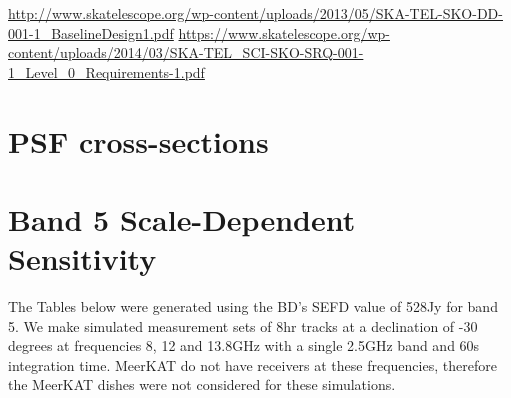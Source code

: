 \documentclass[sfheadings,a4paper,times,9pt,floats,floatfix]{article}
\begin{document}
\begin{thebibliography}{99}
  \url{http://www.skatelescope.org/wp-content/uploads/2013/05/SKA-TEL-SKO-DD-001-1_BaselineDesign1.pdf}
  \url{https://www.skatelescope.org/wp-content/uploads/2014/03/SKA-TEL_SCI-SKO-SRQ-001-1_Level_0_Requirements-1.pdf}
\end{thebibliography}
\pagebreak
\appendix
\section{PSF cross-sections}\label{app:psf}
\section{Band 5 Scale-Dependent Sensitivity}\label{sec:band5}
The Tables below were generated using the BD's SEFD value of 528Jy for band 5. We make simulated measurement sets of 8hr tracks
at a declination of -30 degrees at frequencies 8, 12 and 13.8GHz with a single 2.5GHz band and 60s integration time. MeerKAT do
not have receivers at these frequencies, therefore the MeerKAT dishes were not considered for these simulations.
% 
% 
% 
% 
% 
% 
% 
% 
\end{document}
